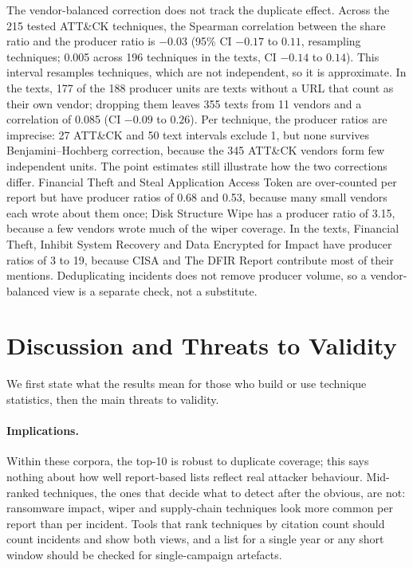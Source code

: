 \documentclass[runningheads]{llncs}
\newcommand{\attack}{ATT\&CK}
\begin{document}
The vendor-balanced correction does not track the duplicate effect. Across the 215 tested \attack{} techniques, the Spearman correlation between the share ratio and the producer ratio is $-0.03$ (95\% CI $-0.17$ to $0.11$, resampling techniques; 0.005 across 196 techniques in the texts, CI $-0.14$ to $0.14$). This interval resamples techniques, which are not independent, so it is approximate. In the texts, 177 of the 188 producer units are texts without a URL that count as their own vendor; dropping them leaves 355 texts from 11 vendors and a correlation of 0.085 (CI $-0.09$ to $0.26$). Per technique, the producer ratios are imprecise: 27 \attack{} and 50 text intervals exclude 1, but none survives Benjamini--Hochberg correction, because the 345 \attack{} vendors form few independent units. The point estimates still illustrate how the two corrections differ. Financial Theft and Steal Application Access Token are over-counted per report but have producer ratios of 0.68 and 0.53, because many small vendors each wrote about them once; Disk Structure Wipe has a producer ratio of 3.15, because a few vendors wrote much of the wiper coverage. In the texts, Financial Theft, Inhibit System Recovery and Data Encrypted for Impact have producer ratios of 3 to 19, because CISA and The DFIR Report contribute most of their mentions. Deduplicating incidents does not remove producer volume, so a vendor-balanced view is a separate check, not a substitute.

\section{Discussion and Threats to Validity}

We first state what the results mean for those who build or use technique statistics, then the main threats to validity.

\paragraph{Implications.} Within these corpora, the top-10 is robust to duplicate coverage; this says nothing about how well report-based lists reflect real attacker behaviour. Mid-ranked techniques, the ones that decide what to detect after the obvious, are not: ransomware impact, wiper and supply-chain techniques look more common per report than per incident. Tools that rank techniques by citation count should count incidents and show both views, and a list for a single year or any short window should be checked for single-campaign artefacts.
\end{document}
